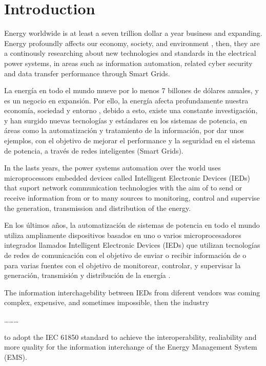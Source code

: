 \section{Introduction}

Energy worldwide is at least a seven trillion dollar
a year business and expanding. Energy profoundly affects 
our economy, society, and environment \cite{Dukert:2009ab}, 
then, they are a continously researching about new technologies 
and standards in the electrical power systems, in areas such as 
information automation, related cyber security and data 
transfer performance through Smart Grids.

La energ\'ia en todo el mundo mueve por lo menos 7 billones de 
d\'olares anuales, y es un negocio en expansi\'on. Por ello, la 
energ\'ia afecta profundamente nuestra econom\'ia, sociedad y 
entorno \cite{Dukert2009}, debido a esto, existe una constante 
investigaci\'on, y han surgido nuevas tecnolog\'ias y est\'andares 
en los sistemas de potencia, en \'areas como la automatizaci\'on 
y tratamiento de la informaci\'on, por dar unos ejemplos, con el
objetivo de mejorar el performance y la seguridad en el sistema 
de potencia, a trav\'es de redes inteligentes (Smart Grids).

In the lasts years,  the power systems automation over the world
uses microprocessors embedded devices 
\cite{Santoso:2000, Schwarz:2000mc} called
Intelligent Electronic Devices (IEDs) that suport 
network communication technologies with
the aim of to send or receive information from or to many sources
to monitoring, control and supervise the generation, transmission 
and distribution of the energy. 

En los \'ultimos a\~nos, la automatizaci\'on de sistemas de potencia 
en todo el mundo utiliza ampliamente dispositivos basados en uno o 
varios microprocesadores \cite{Santoso:2000, Schwarz:2000mc} integrados 
llamados Intelligent Electronic Devices (IEDs)  que utilizan 
tecnolog\'ias de redes de comunicaci\'on con el objetivo de enviar 
o recibir informaci\'on de o para varias fuentes con el objetivo 
de monitorear, controlar, y supervisar la generaci\'on, transmisi\'on 
y distribuci\'on de la energ\'ia
   \cite{McDonald:2007, IEEE:1997dic, Schwarz:2008wi}.

The information interchagebility between IEDs from diferent
vendors was coming complex, expensive, and sometimes 
impossible, then the industry 

\ldots\ldots\ldots

to adopt the IEC 61850 standard to achieve the interoperability, 
realiability and more quality for the information interchange 
of the Energy Management System (EMS).

